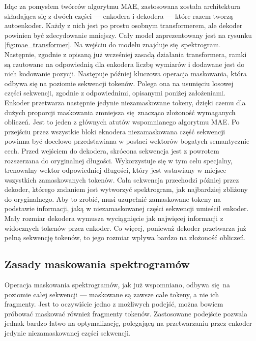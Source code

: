 Idąc za pomysłem twórców algorytmu MAE, zastosowana została architektura składająca się z dwóch części --- enkodera i dekodera --- które razem tworzą autoenkoder. Każdy z nich jest po prostu osobnym transformerem, ale dekoder powinien być zdecydowanie mniejszy. Cały model zaprezentowany jest na rysunku \ref{fig:mae_transformer}. Na wejściu do modelu znajduje się spektrogram. Następnie, zgodnie z opisaną już wcześniej zasadą działania transformera, ramki są rzutowane na odpowiednią dla enkodera liczbę wymiarów i dodawane jest do nich kodowanie pozycji. Następuje później kluczowa operacja maskowania, która odbywa się na poziomie sekwencji tokenów. Polega ona na usunięciu losowej części sekwencji, zgodnie z odpowiednimi, opisanymi poniżej założeniami. Enkoder przetwarza następnie jedynie niezamaskowane tokeny, dzięki czemu dla dużych proporcji maskowania zmniejsza się znacząco złożoność wymaganych obliczeń. Jest to jeden z głównych atutów wspomnianego algorytmu MAE. Po przejściu przez wszystkie bloki eknodera niezamaskowana część sekwencji powinna być docelowo przedstawiana w postaci wektorów bogatych semantycznie cech. Przed wejściem do dekodera, skrócona sekwencja jest z powrotem rozszerzana do oryginalnej długości. Wykorzystuje się w tym celu specjalny, trenowalny wektor odpowiedniej długości, który jest wstawiany w miejsce wszystkich zamaskowanych tokenów. Cała sekwencja przechodzi później przez dekoder, którego zadaniem jest wytworzyć spektrogram, jak najbardziej zbliżony do oryginalnego. Aby to zrobić, musi uzupełnić zamaskowane tokeny na podstawie informacji, jaką w niezamaskowanej części sekwencji umieścił enkoder. Mały rozmiar dekodera wymusza wyciągnięcie jak najwięcej informacji z widocznych tokenów przez enkoder. Co więcej, ponieważ dekoder przetwarza już pełną sekwencję tokenów, to jego rozmiar wpływa bardzo na złożoność obliczeń.

\subsection{Zasady maskowania spektrogramów}

Operacja maskowania spektrogramów, jak już wspomniano, odbywa się na poziomie całej sekwencji --- maskowane są zawsze całe tokeny, a nie ich fragmenty. Jest to oczywiście jedno z możliwych podejść, można bowiem próbować maskować również fragmenty tokenów. Zastosowane podejście pozwala jednak bardzo łatwo na optymalizację, polegającą na przetwarzaniu przez enkoder jedynie niezamaskowanej części sekwencji.

